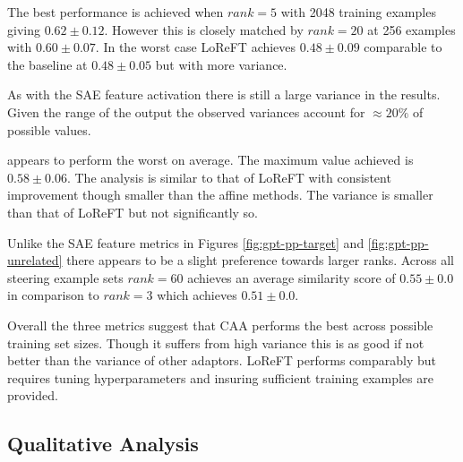 The best performance is achieved when $rank = 5$ with 2048 training examples giving $0.62 \pm 0.12$.
However this is closely matched by $rank = 20$ at 256 examples with $0.60 \pm 0.07$.
In the worst case LoReFT achieves $0.48 \pm 0.09$ comparable to the baseline at $0.48 \pm 0.05$ but with more variance.

As with the SAE feature activation there is still a large variance in the results.
Given the range of the output the observed variances account for $\approx 20\%$ of possible values.

 appears to perform the worst on average.
The maximum value achieved is $0.58 \pm 0.06$.
The analysis is similar to that of LoReFT with consistent improvement though smaller than the affine methods.
The variance is smaller than that of LoReFT but not significantly so.

Unlike the SAE feature metrics in Figures \ref{fig:gpt-pp-target} and \ref{fig:gpt-pp-unrelated} there appears to be a slight preference towards larger ranks.
Across all steering example sets $rank = 60$ achieves an average similarity score of $0.55 \pm 0.0$ in comparison to $rank = 3$ which achieves $0.51 \pm 0.0$.

Overall the three metrics suggest that CAA performs the best across possible training set sizes.
Though it suffers from high variance this is as good if not better than the variance of other adaptors.
LoReFT performs comparably but requires tuning hyperparameters and insuring sufficient training examples are provided.

\subsection{Qualitative Analysis}
\label{sec:qual}






